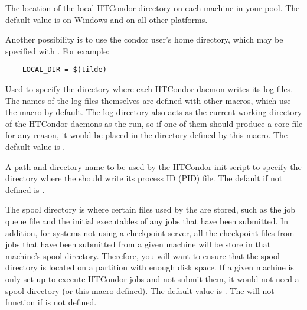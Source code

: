 \begin{description}
\label{param:LocalDir}
\item[\Macro{LOCAL\_DIR}]
  The location of the
  local HTCondor directory on each machine in your pool.
  The default value is  on Windows and
   on all other
  platforms.
  
  Another possibility
  is to use the condor user's home directory, which may be
  specified with . For example:
  \begin{verbatim}
    LOCAL_DIR = $(tilde)
  \end{verbatim}

\label{param:Log}
\item[\Macro{LOG}]
  Used to specify the
  directory where each HTCondor daemon writes its log files.  The names
  of the log files themselves are defined with other macros, which use
  the  macro by default.  The log directory also acts as
  the current working directory of the HTCondor daemons as the run, so
  if one of them should produce a core file for any reason, it would
  be placed in the directory defined by this macro.
  The default value is .

\label{param:Run}
\item[\Macro{RUN}]
  A path and directory name to be used by the HTCondor init script to 
  specify the directory where the  should write its process ID
  (PID) file. 
  The default if not defined is .
  
\label{param:Spool}
\item[\Macro{SPOOL}]
  The spool directory is where
  certain files used by the  are stored, such as the
  job queue file and the initial executables of any jobs that have
  been submitted.  In addition, for systems not using a checkpoint
  server, all the checkpoint files from jobs that have been submitted
  from a given machine will be store in that machine's spool
  directory.  Therefore, you will want to ensure that the spool
  directory is located on a partition with enough disk space.  If a
  given machine is only set up to execute HTCondor jobs and not submit
  them, it would not need a spool directory (or this macro defined).
  The default value is .
  The 
  will not function if  is not defined.
  

\end{description}
